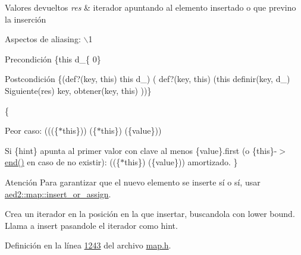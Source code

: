 \begin{DoxyRetVals}{\-Valores devueltos}
{\em res} & iterador apuntando al elemento insertado o que previno la inserción\\
\hline
\end{DoxyRetVals}
\begin{DoxyParagraph}{\-Aspectos de aliasing\-:}
$\backslash$1
\end{DoxyParagraph}
\begin{DoxyPrecond}{\-Precondición}
\{this  d\-\_\-\{ 0\} 
\end{DoxyPrecond}
\begin{DoxyPostcond}{\-Postcondición}
\{(def?(key, this)  this  d\-\_)  ( def?(key, this)  (this  definir(key, d\-\_)  \-Siguiente(res)   key, obtener(key, this)  ))\}
\end{DoxyPostcond}
\{
\begin{DoxyItemize}
\item \-Peor caso\-: (((\{$\ast$this\}))  (\{$\ast$this\})  (\{value\}))
\item \-Si \{hint\} apunta al primer valor con clave al menos \{value\}.first (o \{this\}-\/$>$\hyperlink{classaed2_1_1map_a76023e6a56cb625513e1b5ea028bf983_a76023e6a56cb625513e1b5ea028bf983}{end()} en caso de no existir)\-: ((\{$\ast$this\})  (\{value\})) amortizado. \}
\end{DoxyItemize}

\begin{DoxyAttention}{\-Atención}
\-Para garantizar que el nuevo elemento se inserte sí o sí, usar \hyperlink{classaed2_1_1map_a2ef6723c183916276b0afc4a4c721475_a2ef6723c183916276b0afc4a4c721475}{aed2\-::map\-::insert\-\_\-or\-\_\-assign}.
\end{DoxyAttention}
\-Crea un iterador en la posición en la que insertar, buscandola con lower bound. \-Llama a insert pasandole el iterador como hint. 

\-Definición en la línea \hyperlink{map_8h_source_l01243}{1243} del archivo \hyperlink{map_8h_source}{map.\-h}.

